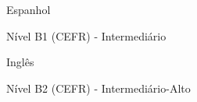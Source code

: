 

\begin{cventries}

  \cventry
    {} %
    {Espanhol} %
    {} %
    {} %
    {
      \begin{cvitems} %
        \item{Nível B1 (CEFR) - Intermediário}
      \end{cvitems}
    }

  \cventry
    {} %
    {Inglês} %
    {} %
    {} %
    {
      \begin{cvitems} %
        \item{Nível B2 (CEFR) - Intermediário-Alto}
      \end{cvitems}
    }

\end{cventries}
